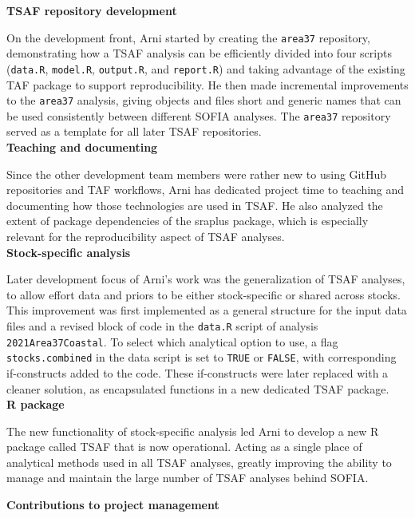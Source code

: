 \documentclass[12pt]{article}
\begin{document}
\textbf{TSAF repository development}

On the development front, Arni started by creating the \verb|area37| repository,
demonstrating how a TSAF analysis can be efficiently divided into four scripts
(\verb|data.R|, \verb|model.R|, \verb|output.R|, and \verb|report.R|) and taking
advantage of the existing TAF package to support reproducibility. He then made
incremental improvements to the \verb|area37| analysis, giving objects and files
short and generic names that can be used consistently between different SOFIA
analyses. The \verb|area37| repository served as a template for all later TSAF
repositories.\\[-2ex]

\textbf{Teaching and documenting}

Since the other development team members were rather new to using GitHub
repositories and TAF workflows, Arni has dedicated project time to teaching and
documenting how those technologies are used in TSAF. He also analyzed the extent
of package dependencies of the {\sf sraplus} package, which is especially
relevant for the reproducibility aspect of TSAF analyses.\\[-2ex]

\textbf{Stock-specific analysis}

Later development focus of Arni's work was the generalization of TSAF analyses,
to allow effort data and priors to be either stock-specific or shared across
stocks. This improvement was first implemented as a general structure for the
input data files and a revised block of code in the \verb|data.R| script of
analysis \verb|2021Area37Coastal|. To select which analytical option to use, a
flag \verb|stocks.combined| in the data script is set to \verb|TRUE| or
\verb|FALSE|, with corresponding if-constructs added to the code. These
if-constructs were later replaced with a cleaner solution, as encapsulated
functions in a new dedicated {\sf TSAF} package.\\[-2ex]

\textbf{R package}

The new functionality of stock-specific analysis led Arni to develop a new R
package called {\sf TSAF} that is now operational. Acting as a single place of
analytical methods used in all TSAF analyses, greatly improving the ability
to manage and maintain the large number of TSAF analyses behind SOFIA.\\[-2ex]

\newpage

\textbf{Contributions to project management}
\end{document}
